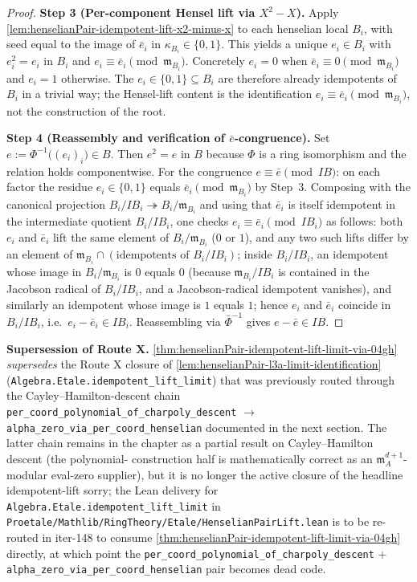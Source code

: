 \begin{proof}
\textbf{Step 3 (Per-component Hensel lift via $X^2 - X$).}
Apply \cref{lem:henselianPair-idempotent-lift-x2-minus-x} to each
henselian local $B_i$, with seed equal to the image of $\bar e_i$
in $\kappa_{B_i} \in \{0, 1\}$. This yields a unique $e_i \in B_i$
with $e_i^2 = e_i$ in $B_i$ and $e_i \equiv \bar e_i \pmod{\mathfrak
m_{B_i}}$. Concretely $e_i = 0$ when $\bar e_i \equiv 0
\pmod{\mathfrak m_{B_i}}$ and $e_i = 1$ otherwise. The
$e_i \in \{0, 1\} \subseteq B_i$ are therefore already idempotents
of $B_i$ in a trivial way; the Hensel-lift content is the
identification $e_i \equiv \bar e_i \pmod{\mathfrak m_{B_i}}$,
not the construction of the root.

\textbf{Step 4 (Reassembly and verification of $\bar e$-congruence).}
Set $e := \Phi^{-1}\bigl((e_i)_{i}\bigr) \in B$. Then $e^2 = e$ in
$B$ because $\Phi$ is a ring isomorphism and the relation holds
componentwise. For the congruence $e \equiv \bar e \pmod{IB}$:
on each factor the residue $e_i \in \{0,1\}$ equals
$\bar e_i \pmod{\mathfrak m_{B_i}}$ by Step~3. Composing with the
canonical projection $B_i / IB_i \twoheadrightarrow
B_i / \mathfrak m_{B_i}$ and using that $\bar e_i$ is itself
idempotent in the intermediate quotient $B_i / IB_i$, one checks
$e_i \equiv \bar e_i \pmod{IB_i}$ as follows: both $e_i$ and
$\bar e_i$ lift the same element of $B_i / \mathfrak m_{B_i}$
($0$ or $1$), and any two such lifts differ by an element of
$\mathfrak m_{B_i} \cap (\text{idempotents of } B_i / IB_i)$;
inside $B_i / IB_i$, an idempotent whose image in
$B_i / \mathfrak m_{B_i}$ is $0$ equals $0$ (because
$\mathfrak m_{B_i} / IB_i$ is contained in the Jacobson radical
of $B_i / IB_i$, and a Jacobson-radical idempotent vanishes),
and similarly an idempotent whose image is $1$ equals $1$;
hence $e_i$ and $\bar e_i$ coincide in $B_i / IB_i$, i.e.\
$e_i - \bar e_i \in IB_i$. Reassembling via $\bar\Phi^{-1}$ gives
$e - \bar e \in IB$.
\end{proof}

\textbf{Supersession of Route X.}
\cref{thm:henselianPair-idempotent-lift-limit-via-04gh}
\emph{supersedes} the Route X closure of
\cref{lem:henselianPair-l3a-limit-identification}
(\texttt{Algebra.Etale.idempotent\_lift\_limit}) that was previously
routed through the Cayley--Hamilton-descent chain
\texttt{per\_coord\_polynomial\_of\_charpoly\_descent}
$\to$ \texttt{alpha\_zero\_via\_per\_coord\_henselian} documented in
the next section. The latter chain remains in the chapter as a
partial result on Cayley--Hamilton descent (the polynomial-
construction half is mathematically correct as an
$\mathfrak m_A^{d+1}$-modular eval-zero supplier), but it is no
longer the active closure of the headline idempotent-lift sorry;
the Lean delivery for
\texttt{Algebra.Etale.idempotent\_lift\_limit} in
\texttt{Proetale/Mathlib/RingTheory/Etale/HenselianPairLift.lean}
is to be re-routed in iter-148 to consume
\cref{thm:henselianPair-idempotent-lift-limit-via-04gh} directly,
at which point the \texttt{per\_coord\_polynomial\_of\_charpoly\_descent}
+ \texttt{alpha\_zero\_via\_per\_coord\_henselian} pair becomes
dead code.

